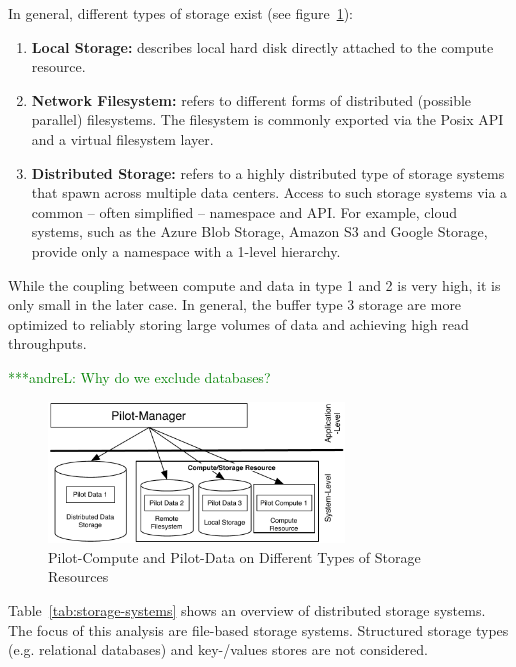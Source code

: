 \documentclass[times]{cpeauth}
\newcommand{\alnote}[1]{ {\textcolor{green} { ***andreL: #1 }}}
\newcommand{\alnote}[1]{}
\begin{document}
In general, different types of storage exist (see 
figure~\ref{fig:figures_storage-types}):

\begin{enumerate}
	\item \textbf{Local Storage:} describes local hard disk directly attached 
	to the compute resource.
	\item \textbf{Network Filesystem:} refers to different forms of 
	distributed (possible parallel) filesystems. The filesystem is commonly 
	exported via the Posix API and a virtual filesystem layer.
	\item \textbf{Distributed Storage:} refers to a highly distributed type of 
	storage systems that spawn across multiple data centers. Access to such 
	storage systems via a common -- often simplified -- namespace and API. For 
	example, cloud systems, such as the Azure Blob Storage, Amazon S3 and 
	Google Storage, provide only a namespace with a 1-level hierarchy. 
\end{enumerate}

While the coupling between compute and data in type 1 and 2 is very high, it 
is only small in the later case. In general, the buffer type 3 storage are 
more optimized to reliably storing large volumes of data and achieving high
read throughputs.

\alnote{Why do we exclude databases?}

\begin{figure}[t]
	\centering
		\includegraphics[width=0.7\textwidth]{figures/storage-types.pdf}
	\caption{Pilot-Compute and Pilot-Data on Different Types of Storage Resources}
	\label{fig:figures_storage-types}
\end{figure}

Table~\ref{tab:storage-systems} shows an overview of distributed storage 
systems. The focus of this analysis are file-based storage systems. Structured
storage types (e.g. relational databases) and key-/values stores are not 
considered.
\end{document}
